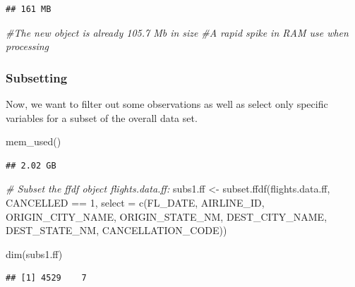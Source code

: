 \documentclass[
  12pt,
]{style/krantz}
\newenvironment{Shaded}{\begin{snugshade}}{\end{snugshade}}
\newcommand{\AttributeTok}[1]{\textcolor[rgb]{0.77,0.63,0.00}{#1}}
\newcommand{\CommentTok}[1]{\textcolor[rgb]{0.56,0.35,0.01}{\textit{#1}}}
\newcommand{\DecValTok}[1]{\textcolor[rgb]{0.00,0.00,0.81}{#1}}
\newcommand{\FunctionTok}[1]{\textcolor[rgb]{0.00,0.00,0.00}{#1}}
\newcommand{\NormalTok}[1]{#1}
\newcommand{\OtherTok}[1]{\textcolor[rgb]{0.56,0.35,0.01}{#1}}
\newcommand{\SpecialCharTok}[1]{\textcolor[rgb]{0.00,0.00,0.00}{#1}}
\begin{document}
\begin{verbatim}
## 161 MB
\end{verbatim}

\begin{Shaded}
\begin{Highlighting}[]
\CommentTok{\#The new object is already 105.7 Mb in size}
\CommentTok{\#A rapid spike in RAM use when processing}
\end{Highlighting}
\end{Shaded}

\hypertarget{subsetting}{%
\subsubsection{Subsetting}\label{subsetting}}

Now, we want to filter out some observations as well as select only specific variables for a subset of the overall data set.

\begin{Shaded}
\begin{Highlighting}[]
\FunctionTok{mem\_used}\NormalTok{()}
\end{Highlighting}
\end{Shaded}

\begin{verbatim}
## 2.02 GB
\end{verbatim}

\begin{Shaded}
\begin{Highlighting}[]
\CommentTok{\# Subset the ffdf object flights.data.ff:}
\NormalTok{subs1.ff }\OtherTok{\textless{}{-}} \FunctionTok{subset.ffdf}\NormalTok{(flights.data.ff, CANCELLED }\SpecialCharTok{==} \DecValTok{1}\NormalTok{, }
                        \AttributeTok{select =} \FunctionTok{c}\NormalTok{(FL\_DATE, AIRLINE\_ID, }
\NormalTok{                                   ORIGIN\_CITY\_NAME,}
\NormalTok{                                   ORIGIN\_STATE\_NM,}
\NormalTok{                                   DEST\_CITY\_NAME,}
\NormalTok{                                   DEST\_STATE\_NM,}
\NormalTok{                                   CANCELLATION\_CODE))}

\FunctionTok{dim}\NormalTok{(subs1.ff)}
\end{Highlighting}
\end{Shaded}

\begin{verbatim}
## [1] 4529    7
\end{verbatim}
\end{document}
